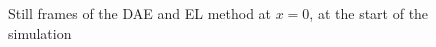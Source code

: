 \documentclass{article}
\begin{document}
\begin{center}
	\begin{figure}[H]
		\centering
		
		\caption{Still frames of the DAE and EL method at $x=0$, at the start of the simulation}%
		\label{fig:example3}%
	\end{figure}
\end{center}
\end{document}
